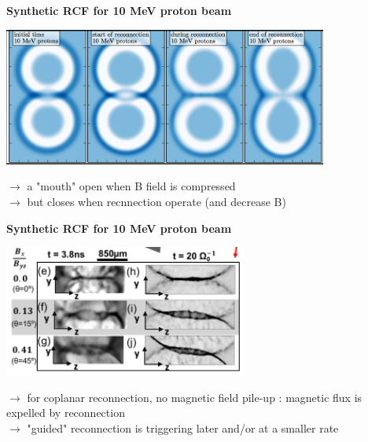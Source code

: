 \documentclass[landscape]{slides}
\begin{document}
\begin{slide}
\large{\textbf{Synthetic RCF for 10 MeV proton beam}}

\begin{center}
\includegraphics[width=0.8\textwidth]{rcf2D.png}
\end{center}

$\rightarrow$ a "mouth" open when B field is compressed\\
$\rightarrow$ but closes when recnnection operate (and decrease B)\\

\end{slide}

\begin{slide}
\large{\textbf{Synthetic RCF for 10 MeV proton beam}}

\begin{center}
\includegraphics[width=0.6\textwidth]{crados.png}
\end{center}

$\rightarrow$ for coplanar reconnection, no magnetic field pile-up : magnetic flux is expelled by reconnection\\
$\rightarrow$ "guided" reconnection is triggering later and/or at a smaller rate\\

\end{slide}
\end{document}
